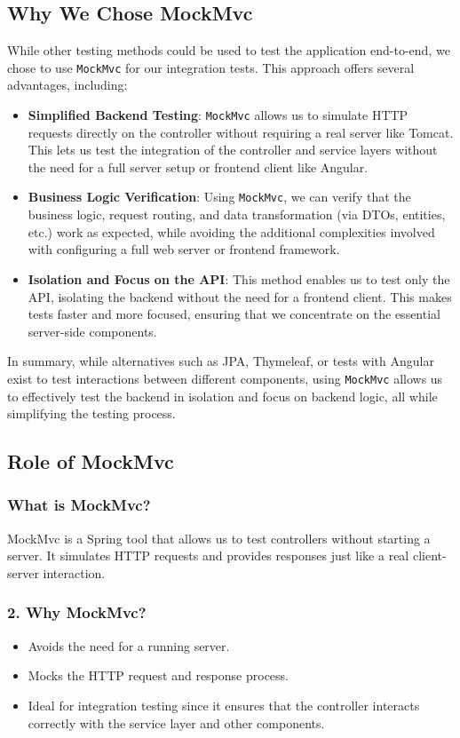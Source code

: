 \documentclass[a4paper,12pt]{article}
\begin{document}
\subsection{Why We Chose MockMvc}
While other testing methods could be used to test the application end-to-end, we chose to use \texttt{MockMvc} for our integration tests. This approach offers several advantages, including:
\begin{itemize}
    \item \textbf{Simplified Backend Testing}: \texttt{MockMvc} allows us to simulate HTTP requests directly on the controller without requiring a real server like Tomcat. This lets us test the integration of the controller and service layers without the need for a full server setup or frontend client like Angular.
    \item \textbf{Business Logic Verification}: Using \texttt{MockMvc}, we can verify that the business logic, request routing, and data transformation (via DTOs, entities, etc.) work as expected, while avoiding the additional complexities involved with configuring a full web server or frontend framework.
    \item \textbf{Isolation and Focus on the API}: This method enables us to test only the API, isolating the backend without the need for a frontend client. This makes tests faster and more focused, ensuring that we concentrate on the essential server-side components.
\end{itemize}

In summary, while alternatives such as JPA, Thymeleaf, or tests with Angular exist to test interactions between different components, using \texttt{MockMvc} allows us to effectively test the backend in isolation and focus on backend logic, all while simplifying the testing process.

\subsection{Role of MockMvc}

\subsubsection{What is MockMvc?}
MockMvc is a Spring tool that allows us to test controllers without starting a server. It simulates HTTP requests and provides responses just like a real client-server interaction.
\subsubsection{2. Why MockMvc?}
\begin{itemize}
    \item Avoids the need for a running server.
    \item Mocks the HTTP request and response process.
    \item Ideal for integration testing since it ensures that the controller interacts correctly with the service layer and other components.
\end{itemize}
\end{document}
